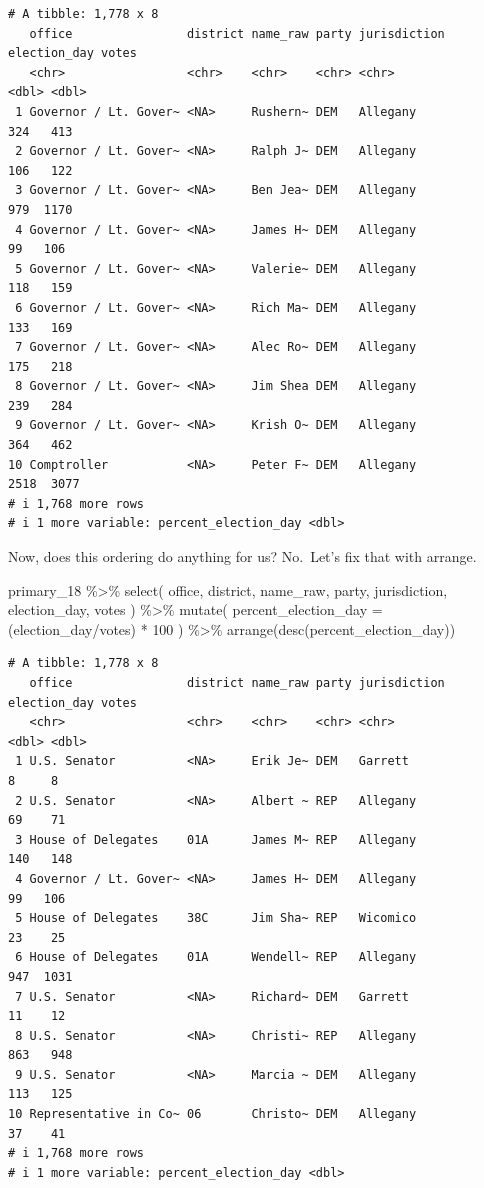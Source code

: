 \documentclass[
  letterpaper,
  DIV=11,
  numbers=noendperiod]{scrreprt}
\newenvironment{Shaded}{\begin{snugshade}}{\end{snugshade}}
\newcommand{\AttributeTok}[1]{\textcolor[rgb]{0.40,0.45,0.13}{#1}}
\newcommand{\DecValTok}[1]{\textcolor[rgb]{0.68,0.00,0.00}{#1}}
\newcommand{\FunctionTok}[1]{\textcolor[rgb]{0.28,0.35,0.67}{#1}}
\newcommand{\NormalTok}[1]{\textcolor[rgb]{0.00,0.23,0.31}{#1}}
\newcommand{\SpecialCharTok}[1]{\textcolor[rgb]{0.37,0.37,0.37}{#1}}
\begin{document}
\begin{verbatim}
# A tibble: 1,778 x 8
   office                district name_raw party jurisdiction election_day votes
   <chr>                 <chr>    <chr>    <chr> <chr>               <dbl> <dbl>
 1 Governor / Lt. Gover~ <NA>     Rushern~ DEM   Allegany              324   413
 2 Governor / Lt. Gover~ <NA>     Ralph J~ DEM   Allegany              106   122
 3 Governor / Lt. Gover~ <NA>     Ben Jea~ DEM   Allegany              979  1170
 4 Governor / Lt. Gover~ <NA>     James H~ DEM   Allegany               99   106
 5 Governor / Lt. Gover~ <NA>     Valerie~ DEM   Allegany              118   159
 6 Governor / Lt. Gover~ <NA>     Rich Ma~ DEM   Allegany              133   169
 7 Governor / Lt. Gover~ <NA>     Alec Ro~ DEM   Allegany              175   218
 8 Governor / Lt. Gover~ <NA>     Jim Shea DEM   Allegany              239   284
 9 Governor / Lt. Gover~ <NA>     Krish O~ DEM   Allegany              364   462
10 Comptroller           <NA>     Peter F~ DEM   Allegany             2518  3077
# i 1,768 more rows
# i 1 more variable: percent_election_day <dbl>
\end{verbatim}

Now, does this ordering do anything for us? No.~Let's fix that with
arrange.

\begin{Shaded}
\begin{Highlighting}[]
\NormalTok{primary\_18 }\SpecialCharTok{\%\textgreater{}\%}
  \FunctionTok{select}\NormalTok{(}
\NormalTok{    office, district, name\_raw, party, jurisdiction, election\_day, votes}
\NormalTok{    ) }\SpecialCharTok{\%\textgreater{}\%}
  \FunctionTok{mutate}\NormalTok{(}
  \AttributeTok{percent\_election\_day =}\NormalTok{ (election\_day}\SpecialCharTok{/}\NormalTok{votes) }\SpecialCharTok{*} \DecValTok{100}
\NormalTok{    ) }\SpecialCharTok{\%\textgreater{}\%} 
  \FunctionTok{arrange}\NormalTok{(}\FunctionTok{desc}\NormalTok{(percent\_election\_day))}
\end{Highlighting}
\end{Shaded}

\begin{verbatim}
# A tibble: 1,778 x 8
   office                district name_raw party jurisdiction election_day votes
   <chr>                 <chr>    <chr>    <chr> <chr>               <dbl> <dbl>
 1 U.S. Senator          <NA>     Erik Je~ DEM   Garrett                 8     8
 2 U.S. Senator          <NA>     Albert ~ REP   Allegany               69    71
 3 House of Delegates    01A      James M~ REP   Allegany              140   148
 4 Governor / Lt. Gover~ <NA>     James H~ DEM   Allegany               99   106
 5 House of Delegates    38C      Jim Sha~ REP   Wicomico               23    25
 6 House of Delegates    01A      Wendell~ REP   Allegany              947  1031
 7 U.S. Senator          <NA>     Richard~ DEM   Garrett                11    12
 8 U.S. Senator          <NA>     Christi~ REP   Allegany              863   948
 9 U.S. Senator          <NA>     Marcia ~ DEM   Allegany              113   125
10 Representative in Co~ 06       Christo~ DEM   Allegany               37    41
# i 1,768 more rows
# i 1 more variable: percent_election_day <dbl>
\end{verbatim}
\end{document}
